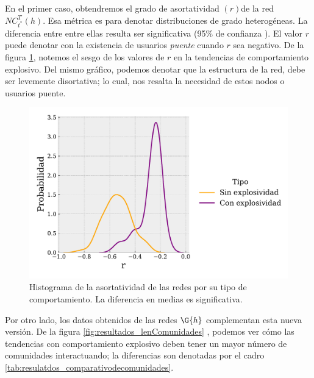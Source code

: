 \documentclass[../main.tex]{subfiles}
\begin{document}
En el primer caso, obtendremos el grado de asortatividad $(r)$de la red $NC_{t^{*}}^{T}(h)$. Esa métrica es para denotar distribuciones de grado heterogéneas. La diferencia entre entre ellas resulta ser significativa (95\% de confianza ).  El valor $r$ puede denotar con la existencia de usuarios \textit{puente} cuando $r$ sea negativo. De la figura \ref{fig:results_RmaxInteract}, notemos el sesgo de los valores de $r$ en la tendencias de comportamiento explosivo. Del mismo gráfico, podemos denotar que la estructura de la red, debe ser levemente disortativa; lo cual, nos resalta la necesidad de estos nodos o usuarios puente.


\begin{figure}
    \centering
    \includegraphics[scale = 0.7]{images/results_Rmaxinteract.pdf}
    \caption{Histograma de la asortatividad de las redes por su tipo de comportamiento. La diferencia en medias es significativa.  }
    \label{fig:results_RmaxInteract}
\end{figure}

Por otro lado, los datos obtenidos de las redes $\G{h}$ complementan esta nueva versión. De la figura \ref{fig:resultados_lenComunidades} , podemos ver cómo las tendencias con comportamiento explosivo deben tener un mayor número de comunidades interactuando; la diferencias son denotadas por el cadro \ref{tab:resulatdos_comparativodecomunidades}.
\end{document}
